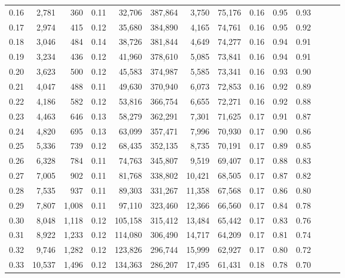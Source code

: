 \begin{tabular}{rrrrrrrrrrrrrr}
0.16 &   2,781 &    360 &  0.11 &   32,706 &  387,864 &   3,750 &  75,176 &  0.16 &  0.95 &      0.93 \\
0.17 &   2,974 &    415 &  0.12 &   35,680 &  384,890 &   4,165 &  74,761 &  0.16 &  0.95 &      0.92 \\
0.18 &   3,046 &    484 &  0.14 &   38,726 &  381,844 &   4,649 &  74,277 &  0.16 &  0.94 &      0.91 \\
0.19 &   3,234 &    436 &  0.12 &   41,960 &  378,610 &   5,085 &  73,841 &  0.16 &  0.94 &      0.91 \\
0.20 &   3,623 &    500 &  0.12 &   45,583 &  374,987 &   5,585 &  73,341 &  0.16 &  0.93 &      0.90 \\
0.21 &   4,047 &    488 &  0.11 &   49,630 &  370,940 &   6,073 &  72,853 &  0.16 &  0.92 &      0.89 \\
0.22 &   4,186 &    582 &  0.12 &   53,816 &  366,754 &   6,655 &  72,271 &  0.16 &  0.92 &      0.88 \\
0.23 &   4,463 &    646 &  0.13 &   58,279 &  362,291 &   7,301 &  71,625 &  0.17 &  0.91 &      0.87 \\
0.24 &   4,820 &    695 &  0.13 &   63,099 &  357,471 &   7,996 &  70,930 &  0.17 &  0.90 &      0.86 \\
0.25 &   5,336 &    739 &  0.12 &   68,435 &  352,135 &   8,735 &  70,191 &  0.17 &  0.89 &      0.85 \\
0.26 &   6,328 &    784 &  0.11 &   74,763 &  345,807 &   9,519 &  69,407 &  0.17 &  0.88 &      0.83 \\
0.27 &   7,005 &    902 &  0.11 &   81,768 &  338,802 &  10,421 &  68,505 &  0.17 &  0.87 &      0.82 \\
0.28 &   7,535 &    937 &  0.11 &   89,303 &  331,267 &  11,358 &  67,568 &  0.17 &  0.86 &      0.80 \\
0.29 &   7,807 &  1,008 &  0.11 &   97,110 &  323,460 &  12,366 &  66,560 &  0.17 &  0.84 &      0.78 \\
0.30 &   8,048 &  1,118 &  0.12 &  105,158 &  315,412 &  13,484 &  65,442 &  0.17 &  0.83 &      0.76 \\
0.31 &   8,922 &  1,233 &  0.12 &  114,080 &  306,490 &  14,717 &  64,209 &  0.17 &  0.81 &      0.74 \\
0.32 &   9,746 &  1,282 &  0.12 &  123,826 &  296,744 &  15,999 &  62,927 &  0.17 &  0.80 &      0.72 \\
0.33 &  10,537 &  1,496 &  0.12 &  134,363 &  286,207 &  17,495 &  61,431 &  0.18 &  0.78 &      0.70 \\

\end{tabular}
